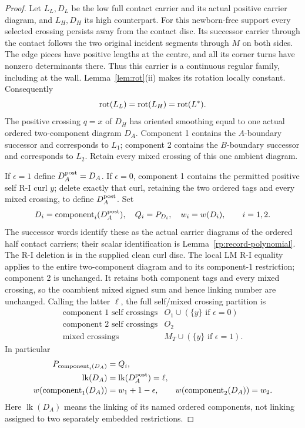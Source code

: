 \begin{proof}
Let $L_L,D_L$ be the low full contact carrier and its actual positive carrier
diagram, and $L_H,D_H$ its high counterpart.  For this newborn-free support every selected crossing persists away
from the contact disc. Its successor carrier through the contact follows
the two original incident segments through $M$ on both sides. The edge
pieces have positive lengths at the centre, and all its corner turns
have nonzero determinants there. Thus this carrier is a continuous
regular family, including at the wall. Lemma~\ref{lem:rot}(ii) makes
its rotation locally constant. Consequently
\begin{equation}\label{s7c:full-rotation}
 \operatorname{rot}(L_L)=\operatorname{rot}(L_H)=\operatorname{rot}(L^*).
\end{equation}
The positive crossing $q=x$ of $D_H$ has oriented smoothing equal to
one actual ordered two-component diagram $D_A$.  Component 1 contains
the $A$-boundary successor and corresponds to $L_1$; component 2
contains the $B$-boundary successor and corresponds to $L_2$.
Retain every mixed crossing of this one ambient diagram.

If $\epsilon=1$ define $D_A^{\rm post}=D_A$.  If $\epsilon=0$,
component 1 contains the permitted positive self R-I curl $y$; delete
exactly that curl, retaining the two ordered tags and every mixed crossing,
to define $D_A^{\rm post}$.  Set
\begin{equation}\label{s7c:component-data}
 D_i=\operatorname{component}_i(D_A^{\rm post}),\quad
 Q_i=P_{D_i},\quad w_i=w(D_i),\qquad i=1,2.
\end{equation}
The successor words identify these as the actual carrier diagrams of
the ordered half contact carriers; their scalar identification is
Lemma~\ref{rp:record-polynomial}. The R-I deletion is in the supplied
clean curl disc. The local LM R-I equality applies to the entire
two-component diagram and to its component-1 restriction; component 2
is unchanged. It retains both component tags and every mixed crossing,
so the coambient mixed signed sum and hence linking number are unchanged.  Calling the latter $\ell$,
the full self/mixed crossing partition is
\begin{equation}\label{s7c:crossing-partition}
 \begin{array}{c|l}
 \text{component 1 self crossings}&O_1\cup(\{y\}\text{ if }\epsilon=0)\\
 \text{component 2 self crossings}&O_2\\
 \text{mixed crossings}&M_T\cup(\{y\}\text{ if }\epsilon=1).
 \end{array}
\end{equation}
In particular
\begin{align}
 P_{\operatorname{component}_i(D_A)}&=Q_i,\label{s7c:component-polynomial}\\
 \operatorname{lk}(D_A)&=\operatorname{lk}(D_A^{\rm post})=\ell,
 \label{s7c:ambient-linking}\\
 w(\operatorname{component}_1(D_A))&=w_1+1-\epsilon,
 \qquad w(\operatorname{component}_2(D_A))=w_2.
 \label{s7c:pre-curl-writhe}
\end{align}
Here $\operatorname{lk}(D_A)$ means the linking of its named ordered
components, not linking assigned to two separately embedded restrictions.


\end{proof}

